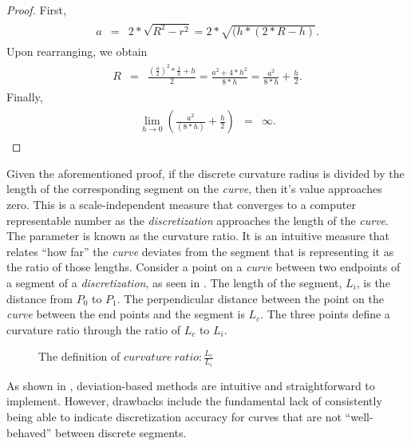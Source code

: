 \begin{proof}
First, 
\begin{eqnarray}
\begin{array}{lcl}
a & = & 2*\sqrt{R^2-r^2}=2*\sqrt{(h*(2*R-h)}.
\end{array}
\end{eqnarray}
Upon rearranging, we obtain
\begin{eqnarray}
\begin{array}{lcl}
R & = & \frac{(\frac{a}{2})^2*\frac{1}{h}+h}{2}=
\frac{a^2+4*h^2}{8*h}=\frac{a^2}{8*h}+\frac{h}{2}.
\end{array}
\end{eqnarray}
Finally,
\begin{eqnarray}
\begin{array}{lcl}
\lim_{h\to0} (\frac{a^2}{(8*h)}+\frac{h}{2}) & = & \infty.
\end{array}
\end{eqnarray}
\end{proof}

Given the aforementioned proof, if the discrete curvature radius is 
divided by the length of the corresponding segment on the \textit{curve}, then it’s value approaches zero. This is a scale-independent measure that converges to a computer representable number as the \textit{discretization} approaches the length of the \textit{curve}. The parameter is known as the curvature ratio. It is an intuitive measure that relates ``how far'' the \textit{curve} deviates from the segment that is representing it as the ratio of those lengths. Consider a point on a \textit{curve} between two endpoints of a segment of a \textit{discretization}, as seen in . The length of the segment, $L_i$, is the distance from $P_0$ to $P_1$. The perpendicular distance between the point on the \textit{curve} between the end points and the segment is $L_c$. The three points define a curvature ratio through the ratio of $L_c$ to $L_i$.

\begin{figure}[h!]
  \caption{\label{ref:CurvatureRatio} The definition of $curvature \ 
ratio:  \frac{L_c}{L_i}$ 
\cite{mclaurin10}}
\end{figure}

\noindent As shown in \cite{mclaurin12}, deviation-based methods are 
intuitive and straightforward to implement. However, drawbacks include the fundamental lack of consistently being able to indicate discretization accuracy for curves that are not ``well-behaved'' between discrete segments.
